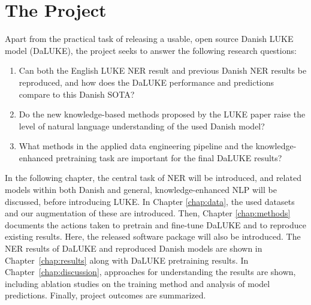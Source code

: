 \documentclass[main.tex]{subfiles}
\begin{document}
\section{The Project}%
\label{sec:project}
Apart from the practical task of releasing a usable, open source Danish LUKE model (DaLUKE), the project seeks to answer the following research questions:
\begin{enumerate}[itemsep=.5em]
    \item
        Can both the English LUKE NER result and previous Danish NER results be reproduced, and how does the DaLUKE performance and predictions compare to this Danish SOTA?
    \item
        Do the new knowledge-based methods proposed by the LUKE paper raise the level of natural language understanding of the used Danish model?
    \item
        What methods in the applied data engineering pipeline and the knowledge-enhanced pretraining task are important for the final DaLUKE results?
\end{enumerate}
In the following chapter, the central task of NER will be introduced, and related models within both Danish and general, knowledge-enhanced NLP will be discussed, before introducing LUKE.
In Chapter \ref{chap:data}, the used datasets and our augmentation of these are introduced.
Then, Chapter \ref{chap:methods} documents the actions taken to pretrain and fine-tune DaLUKE and to reproduce existing results.
Here, the released software package  will also be introduced.
The NER results of DaLUKE and reproduced Danish models are shown in Chapter~\ref{chap:results} along with DaLUKE pretraining results.
In Chapter~\ref{chap:discussion}, approaches for understanding the results are shown, including ablation studies on the training method and analysis of model predictions.
Finally, project outcomes are summarized.
\end{document}
